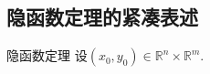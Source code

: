 

\subsection{隐函数定理的紧凑表述}
\begin{theorem}{隐函数定理}
设$(x_0,y_0)\in\mathbb{R}^n\times\mathbb{R}^m$. 
\end{theorem}
